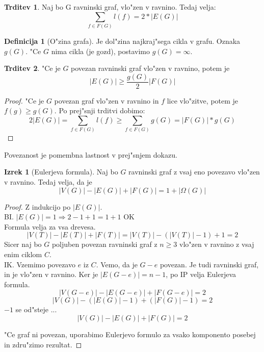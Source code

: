 \documentclass{article}
\theoremstyle{definition}
\newtheorem{definition}{Definicija}[section]
\newtheorem{claim}{Trditev}[section]
\newtheorem{theorem}{Izrek}[section]
\begin{document}
	\begin{claim}
		Naj bo G ravninski graf, vlo"zen v ravnino. Tedaj velja:
		$$ \sum_{f \in F(G)}l(f) = 2*|E(G)| $$
	\end{claim}
	\begin{definition}[O"zina grafa]
		Je dol"zina najkraj"sega cikla v grafu. Oznaka $g(G)$. "Ce $G$ nima cikla (je gozd), postavimo $g(G) = \infty$.
	\end{definition}

	\begin{claim}
		"Ce je $G$ povezan ravninski graf vlo"zen v ravnino, potem je
		$$ |E(G)| \geq \frac{g(G)}{2}|F(G)| $$
		\begin{proof}
			"Ce je $G$ povezan graf vlo"zen v ravnino in $f$ lice vlo"zitve, potem je $f(g) \geq g(G)$. Po prej"snji trditvi dobimo:
			$$ 2|E(G)| = \sum_{f \in F(G)}l(f) \geq \sum_{f \in F(G)} g(G) =|F(G)|*g(G) $$
		\end{proof}
	\end{claim}
	Povezanost je pomembna lastnost v prej"snjem dokazu.
	
	\begin{theorem}[Eulerjeva formula]
		Naj bo $G$ ravninski graf z vsaj eno povezavo vlo"zen v ravnino. Tedaj velja, da je
		$$|V(G)| - |E(G)| + |F(G)| = 1 + |\Omega(G)| $$
		
		
		
		\begin{proof}Z indukcijo po $|E(G)|$. \\
			BI. $|E(G)| = 1 \Rightarrow 2 - 1 + 1 = 1 + 1$ OK \\
			Formula velja za vsa drevesa.
			$$ |V(T)| - |E(T)| + |F(T)| = |V(T)| - (|V(T)|-1) + 1 = 2 $$
			Sicer naj bo $G$ poljuben povezan ravninski graf z $n \geq 3$ vlo"zen v ravnino z vsaj enim ciklom $C$. \\
			IK. Vzemimo povezavo $e$ iz $C$. Vemo, da je $G-e$ povezan. Je tudi ravninski graf, in je vlo"zen v ravnino. Ker je $|E(G-e)| = n-1$, po IP velja Eulerjeva formula.
			$$|V(G-e)| - |E(G-e)| + |F(G-e)| = 2 $$
			$$|V(G)| - (|E(G)|-1) + (|F(G)|-1) = 2 $$
			$-1$ se od"steje ...
			$$|V(G)| - |E(G)| + |F(G)| = 2 $$
			
			"Ce graf ni povezan, uporabimo Eulerjevo formulo za vsako komponento posebej in zdru"zimo rezultat.
		\end{proof}
	\end{theorem}
\end{document}
